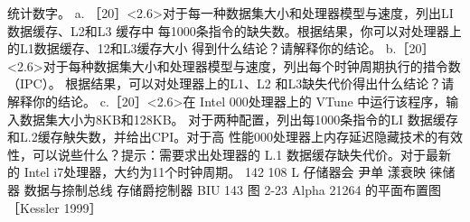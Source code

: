 统计数字。
a. ［20］<2.6>对于每一种数据集大小和处理器模型与速度，列出LI 数据缓存、L2和L3 缓存中
每1000条指令的缺失数。根据结果，你可以对处理器上的L1数据缓存、12和L3缓存大小
得到什么结论？请解释你的结论。
b.［20］<2.6>对于每种数据集大小和处理器模型与速度，列出每个时钟周期执行的措令数（IPC）。
根据结果，可以对处理器上的L1、L2 和L3缺失代价得出什么结论？请解释你的结论。
c.［20］<2.6>在 Intel 000处理器上的 VTune 中运行该程序，输入数据集大小为8KB和128KB。
对于两种配置，列出每1000条指令的LI 数据缓存和L.2缓存觖失数，并给出CPI。对于高
性能000处理器上内存延迟隐藏技术的有效性，可以说些什么？提示：需要求出处理器的
L.1 数据缓存缺失代价。对于最新的 Intel i7处理器，大约为11个时钟周期。
142
108
L 仔储器会
尹单
漾衰映
徕储器
数据与捺制总线
存储爵挖制器
BIU
143
图 2-23
Alpha 21264 的平面布置图［Kessler 1999］